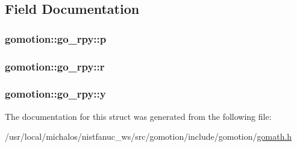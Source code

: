 \subsection{Field Documentation}
\hypertarget{structgomotion_1_1go__rpy_a309f825360e8b7b41577208d606f3e4d}{
\subsubsection[{p}]{ gomotion\-::go\-\_\-rpy\-::p}}\label{structgomotion_1_1go__rpy_a309f825360e8b7b41577208d606f3e4d}
\hypertarget{structgomotion_1_1go__rpy_a37241d3fe9431d408add42f27e395154}{
\subsubsection[{r}]{ gomotion\-::go\-\_\-rpy\-::r}}\label{structgomotion_1_1go__rpy_a37241d3fe9431d408add42f27e395154}
\hypertarget{structgomotion_1_1go__rpy_a38a63e8c2a10283b56c3a697f142f8e2}{
\subsubsection[{y}]{ gomotion\-::go\-\_\-rpy\-::y}}\label{structgomotion_1_1go__rpy_a38a63e8c2a10283b56c3a697f142f8e2}


The documentation for this struct was generated from the following file\-:\begin{DoxyCompactItemize}
\item 
/usr/local/michalos/nistfanuc\-\_\-ws/src/gomotion/include/gomotion/\hyperlink{gomath_8h}{gomath.\-h}\end{DoxyCompactItemize}
